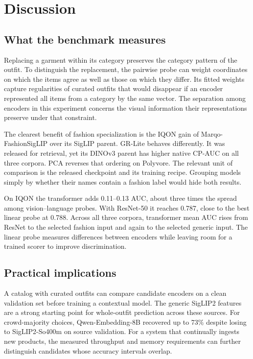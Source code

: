 \section{Discussion}
\subsection{What the benchmark measures}
Replacing a garment within its category preserves the category pattern of the outfit. To distinguish the replacement, the pairwise probe can weight coordinates on which the items agree as well as those on which they differ. Its fitted weights capture regularities of curated outfits that would disappear if an encoder represented all items from a category by the same vector. The separation among encoders in this experiment concerns the visual information their representations preserve under that constraint.

The clearest benefit of fashion specialization is the IQON gain of Marqo-FashionSigLIP over its SigLIP parent. GR-Lite behaves differently. It was released for retrieval, yet its DINOv3 parent has higher native CP-AUC on all three corpora. PCA reverses that ordering on Polyvore. The relevant unit of comparison is the released checkpoint and its training recipe. Grouping models simply by whether their names contain a fashion label would hide both results.

On IQON the transformer adds 0.11--0.13 AUC, about three times the spread among vision--language probes. With ResNet-50 it reaches 0.787, close to the best linear probe at 0.788. Across all three corpora, transformer mean AUC rises from ResNet to the selected fashion input and again to the selected generic input. The linear probe measures differences between encoders while leaving room for a trained scorer to improve discrimination.

\subsection{Practical implications}
A catalog with curated outfits can compare candidate encoders on a clean validation set before training a contextual model. The generic SigLIP2 features are a strong starting point for whole-outfit prediction across these sources. For crowd-majority choices, Qwen-Embedding-8B recovered up to 73\% despite losing to SigLIP2-So400m on source validation. For a system that continually ingests new products, the measured throughput and memory requirements can further distinguish candidates whose accuracy intervals overlap.

